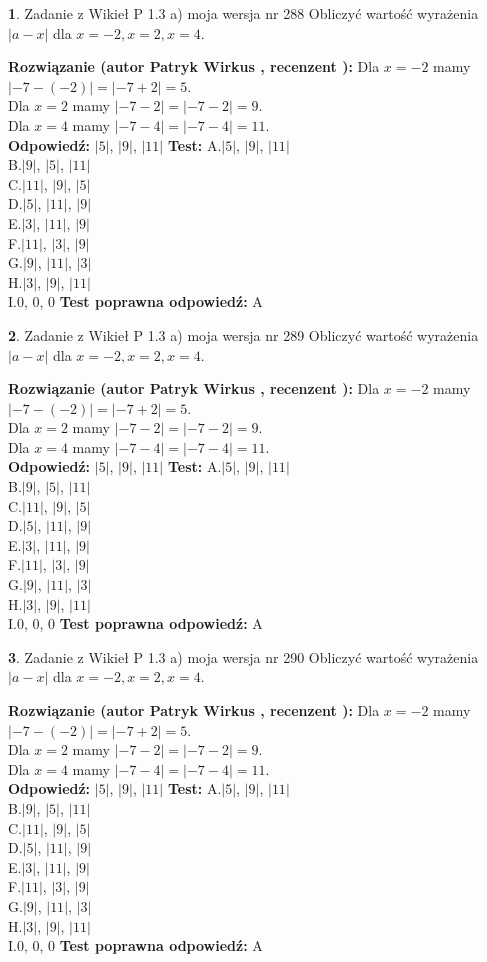 \documentclass[12pt, a4paper]{article}
\theoremstyle{definition} %
\newtheorem{zad}{}
\newcommand{\zadStart}[1]{\begin{zad}#1\newline}
\newcommand{\zadStop}{\end{zad}}
\newcommand{\rozwStart}[2]{\noindent \textbf{Rozwiązanie (autor #1 , recenzent #2): }\newline}
\newcommand{\rozwStop}{\newline}
\newcommand{\odpStart}{\noindent \textbf{Odpowiedź:}\newline}
\newcommand{\odpStop}{\newline}
\newcommand{\testStart}{\noindent \textbf{Test:}\newline}
\newcommand{\testStop}{\newline}
\newcommand{\kluczStart}{\noindent \textbf{Test poprawna odpowiedź:}\newline}
\newcommand{\kluczStop}{\newline}
\begin{document}
\zadStart{Zadanie z Wikieł P 1.3 a) moja wersja nr 288}
Obliczyć wartość wyrażenia $|a - x|$ dla $x=-2,x=2,x=4$.
\zadStop
\rozwStart{Patryk Wirkus}{}
Dla $x = -2$ mamy $|-7 - (-2)| = |-7 + 2| = 5$.\\
Dla $x = 2$ mamy $|-7 - 2| = |-7 - 2| = 9$.\\
Dla $x = 4$ mamy $|-7 - 4| = |-7 - 4| = 11$.\\
\rozwStop
\odpStart
$|5|$, $|9|$, $|11|$
\odpStop
\testStart
A.$|5|$, $|9|$, $|11|$\\
B.$|9|$, $|5|$, $|11|$\\
C.$|11|$, $|9|$, $|5|$\\
D.$|5|$, $|11|$, $|9|$\\
E.$|3|$, $|11|$, $|9|$\\
F.$|11|$, $|3|$, $|9|$\\
G.$|9|$, $|11|$, $|3|$\\
H.$|3|$, $|9|$, $|11|$\\
I.$0$, $0$, $0$
\testStop
\kluczStart
A
\kluczStop



\zadStart{Zadanie z Wikieł P 1.3 a) moja wersja nr 289}
Obliczyć wartość wyrażenia $|a - x|$ dla $x=-2,x=2,x=4$.
\zadStop
\rozwStart{Patryk Wirkus}{}
Dla $x = -2$ mamy $|-7 - (-2)| = |-7 + 2| = 5$.\\
Dla $x = 2$ mamy $|-7 - 2| = |-7 - 2| = 9$.\\
Dla $x = 4$ mamy $|-7 - 4| = |-7 - 4| = 11$.\\
\rozwStop
\odpStart
$|5|$, $|9|$, $|11|$
\odpStop
\testStart
A.$|5|$, $|9|$, $|11|$\\
B.$|9|$, $|5|$, $|11|$\\
C.$|11|$, $|9|$, $|5|$\\
D.$|5|$, $|11|$, $|9|$\\
E.$|3|$, $|11|$, $|9|$\\
F.$|11|$, $|3|$, $|9|$\\
G.$|9|$, $|11|$, $|3|$\\
H.$|3|$, $|9|$, $|11|$\\
I.$0$, $0$, $0$
\testStop
\kluczStart
A
\kluczStop



\zadStart{Zadanie z Wikieł P 1.3 a) moja wersja nr 290}
Obliczyć wartość wyrażenia $|a - x|$ dla $x=-2,x=2,x=4$.
\zadStop
\rozwStart{Patryk Wirkus}{}
Dla $x = -2$ mamy $|-7 - (-2)| = |-7 + 2| = 5$.\\
Dla $x = 2$ mamy $|-7 - 2| = |-7 - 2| = 9$.\\
Dla $x = 4$ mamy $|-7 - 4| = |-7 - 4| = 11$.\\
\rozwStop
\odpStart
$|5|$, $|9|$, $|11|$
\odpStop
\testStart
A.$|5|$, $|9|$, $|11|$\\
B.$|9|$, $|5|$, $|11|$\\
C.$|11|$, $|9|$, $|5|$\\
D.$|5|$, $|11|$, $|9|$\\
E.$|3|$, $|11|$, $|9|$\\
F.$|11|$, $|3|$, $|9|$\\
G.$|9|$, $|11|$, $|3|$\\
H.$|3|$, $|9|$, $|11|$\\
I.$0$, $0$, $0$
\testStop
\kluczStart
A
\kluczStop
\end{document}
